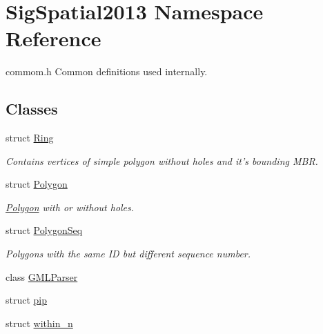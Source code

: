 \hypertarget{namespaceSigSpatial2013}{\section{Sig\-Spatial2013 Namespace Reference}
\label{namespaceSigSpatial2013}
}


commom.\-h Common definitions used internally.  


\subsection*{Classes}
\begin{DoxyCompactItemize}
\item 
struct \hyperlink{structSigSpatial2013_1_1Ring}{Ring}
\begin{DoxyCompactList}\small\item\em Contains vertices of simple polygon without holes and it's bounding M\-B\-R. \end{DoxyCompactList}\item 
struct \hyperlink{structSigSpatial2013_1_1Polygon}{Polygon}
\begin{DoxyCompactList}\small\item\em \hyperlink{structSigSpatial2013_1_1Polygon}{Polygon} with or without holes. \end{DoxyCompactList}\item 
struct \hyperlink{structSigSpatial2013_1_1PolygonSeq}{Polygon\-Seq}
\begin{DoxyCompactList}\small\item\em Polygons with the same I\-D but different sequence number. \end{DoxyCompactList}\item 
class \hyperlink{classSigSpatial2013_1_1GMLParser}{G\-M\-L\-Parser}
\item 
struct \hyperlink{structSigSpatial2013_1_1pip}{pip}
\item 
struct \hyperlink{structSigSpatial2013_1_1within__n}{within\-\_\-n}
\end{DoxyCompactItemize}
